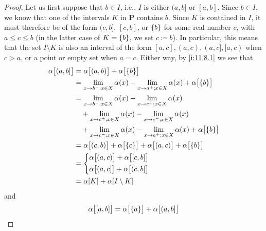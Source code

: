 \begin{proof}
      Let us first suppose that \(b \in I\), i.e., \(I\) is either \((a, b]\) or \([a, b]\).
  Since \(b \in I\), we know that one of the intervals \(K\) in \(\mathbf{P}\) contains \(b\).
  Since \(K\) is contained in \(I\), it must therefore be of the form \((c, b]\), \([c, b]\), or \(\left\lbrace b\right\rbrace\) for some real number \(c\), with \(a \leq c \leq b\) (in the latter case of \(K = \left\lbrace b\right\rbrace\), we set \(c \coloneqq b\)).
  In particular, this means that the set \(I \setminus K\) is also an interval of the form \([a, c], (a, c), (a, c], [a, c)\) when \(c > a\), or a point or empty set when \(a = c\).
  Either way, by \cref{i:11.8.1} we see that
  \begin{align*}
    \alpha\big[(a, b]\big] & = \alpha\big[(a, b)\big] + \alpha\big[\set{b}\big]                                                            \\
                           & = \lim_{x \to b^- ; x \in X} \alpha(x) - \lim_{x \to a^+ ; x \in X} \alpha(x) + \alpha\big[\set{b}\big]       \\
                           & = \lim_{x \to b^- ; x \in X} \alpha(x) - \lim_{x \to c^+ ; x \in X} \alpha(x)                                 \\
                           & \quad + \lim_{x \to c^+ ; x \in X} \alpha(x) - \lim_{x \to c^- ; x \in X} \alpha(x)                           \\
                           & \quad + \lim_{x \to c^- ; x \in X} \alpha(x) - \lim_{x \to a^+ ; x \in X} \alpha(x) + \alpha\big[\set{b}\big] \\
                           & = \alpha\big[(c, b)\big] + \alpha\big[\set{c}\big] + \alpha\big[(a, c)\big] + \alpha\big[\set{b}\big]         \\
                           & = \begin{dcases}
                                 \alpha\big[(a, c)\big] + \alpha\big[[c, b]\big] \\
                                 \alpha\big[(a, c]\big] + \alpha\big[(c, b]\big]
                               \end{dcases}                             \\
                           & = \alpha[K] + \alpha[I \setminus K]
  \end{align*}
  and
  \begin{align*}
    \alpha\big[[a, b]\big] & = \alpha\big[\set{a}\big] + \alpha\big[(a, b]\big]                                                                         \\

\end{align*}
\end{proof}
